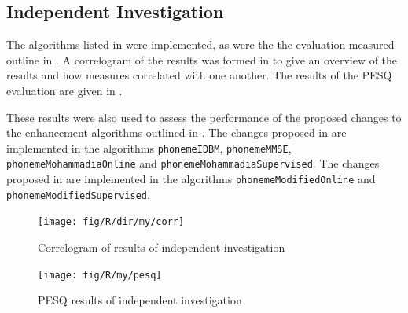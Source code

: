 \clearpage{}


\subsection{Independent Investigation}

The algorithms listed in  were implemented,
as were the the evaluation measured outline in .
A correlogram of the results was formed in  to give
an overview of the results and how measures correlated with one another.
The results of the \ac{PESQ} evaluation are given in .

These results were also used to assess the performance of the proposed
changes to the enhancement algorithms outlined in .
The changes proposed in  are implemented
in the algorithms \lstinline[breaklines=true]!phonemeIDBM!, \lstinline[breaklines=true]!phonemeMMSE!,
\lstinline[breaklines=true]!phonemeMohammadiaOnline! and \lstinline[breaklines=true]!phonemeMohammadiaSupervised!.
The changes proposed in  are implemented
in the algorithms \lstinline[breaklines=true]!phonemeModifiedOnline!
and \lstinline[breaklines=true]!phonemeModifiedSupervised!.

\begin{figure}[h]
\noindent \begin{centering}
\texttt{[image: fig/R/dir/my/corr]}
\par\end{centering}

\protect\caption{\label{fig:my-Corr}\foreignlanguage{australian}{Correlogram of results
of independent investigation}%
}
\end{figure}


\begin{figure}[p]
\noindent \begin{centering}
\texttt{[image: fig/R/my/pesq]}
\par\end{centering}

\protect\caption{\label{fig:my-PESQ}\foreignlanguage{australian}{\acs{PESQ} results
of independent investigation}%
}
\end{figure}


